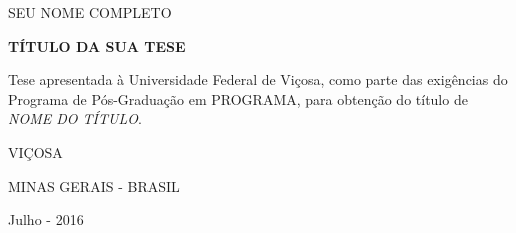 
   \thispagestyle{empty}
   \setcounter{page}{0}
\begin{spacing}{1}
	\begin{center}
		\vspace*{-0.5cm}
		{\MakeUppercase{Seu Nome Completo} \\ }
		
		
		\vspace*{8cm}
		{\MakeUppercase{\textbf{Título da sua tese}} \\ }
	\end{center}
	\vspace*{4cm}
	\singlespacing
	\begin{flushright}
		\begin{minipage}{7.5cm}
			{Tese apresentada à Universidade Federal de Viçosa, como parte
				das exigências do Programa de Pós-Graduação em PROGRAMA, para
				obtenção do título de \textit{NOME DO TÍTULO}.}
		\end{minipage}
	\end{flushright}
	\vfill
	
	\begin{center}
	VIÇOSA
	
	MINAS GERAIS - BRASIL
	
	Julho - 2016
	
	
	\end{center}
	
\end{spacing}
